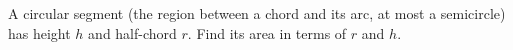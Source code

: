 A circular segment (the region between a chord and its arc, at most a semicircle) has height $h$ and half-chord $r$. Find its area in terms of $r$ and $h$.
